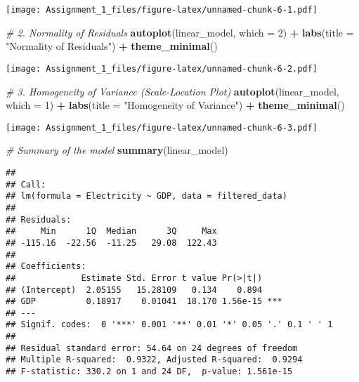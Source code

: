 \documentclass[
]{article}
\newenvironment{Shaded}{\begin{snugshade}}{\end{snugshade}}
\newcommand{\AttributeTok}[1]{\textcolor[rgb]{0.13,0.29,0.53}{#1}}
\newcommand{\CommentTok}[1]{\textcolor[rgb]{0.56,0.35,0.01}{\textit{#1}}}
\newcommand{\DecValTok}[1]{\textcolor[rgb]{0.00,0.00,0.81}{#1}}
\newcommand{\FunctionTok}[1]{\textcolor[rgb]{0.13,0.29,0.53}{\textbf{#1}}}
\newcommand{\NormalTok}[1]{#1}
\newcommand{\SpecialCharTok}[1]{\textcolor[rgb]{0.81,0.36,0.00}{\textbf{#1}}}
\newcommand{\StringTok}[1]{\textcolor[rgb]{0.31,0.60,0.02}{#1}}
\begin{document}
\texttt{[image: Assignment\_1\_files/figure-latex/unnamed-chunk-6-1.pdf]}

\begin{Shaded}
\begin{Highlighting}[]
\CommentTok{\# 2. Normality of Residuals}
\FunctionTok{autoplot}\NormalTok{(linear\_model, }\AttributeTok{which =} \DecValTok{2}\NormalTok{) }\SpecialCharTok{+} 
  \FunctionTok{labs}\NormalTok{(}\AttributeTok{title =} \StringTok{"Normality of Residuals"}\NormalTok{) }\SpecialCharTok{+}
  \FunctionTok{theme\_minimal}\NormalTok{()}
\end{Highlighting}
\end{Shaded}

\texttt{[image: Assignment\_1\_files/figure-latex/unnamed-chunk-6-2.pdf]}

\begin{Shaded}
\begin{Highlighting}[]
\CommentTok{\# 3. Homogeneity of Variance (Scale{-}Location Plot)}
\FunctionTok{autoplot}\NormalTok{(linear\_model, }\AttributeTok{which =} \DecValTok{1}\NormalTok{) }\SpecialCharTok{+} 
  \FunctionTok{labs}\NormalTok{(}\AttributeTok{title =} \StringTok{"Homogeneity of Variance"}\NormalTok{) }\SpecialCharTok{+}
  \FunctionTok{theme\_minimal}\NormalTok{()}
\end{Highlighting}
\end{Shaded}

\texttt{[image: Assignment\_1\_files/figure-latex/unnamed-chunk-6-3.pdf]}

\begin{Shaded}
\begin{Highlighting}[]
\CommentTok{\# Summary of the model}
\FunctionTok{summary}\NormalTok{(linear\_model)}
\end{Highlighting}
\end{Shaded}

\begin{verbatim}
## 
## Call:
## lm(formula = Electricity ~ GDP, data = filtered_data)
## 
## Residuals:
##     Min      1Q  Median      3Q     Max 
## -115.16  -22.56  -11.25   29.08  122.43 
## 
## Coefficients:
##             Estimate Std. Error t value Pr(>|t|)    
## (Intercept)  2.05155   15.28109   0.134    0.894    
## GDP          0.18917    0.01041  18.170 1.56e-15 ***
## ---
## Signif. codes:  0 '***' 0.001 '**' 0.01 '*' 0.05 '.' 0.1 ' ' 1
## 
## Residual standard error: 54.64 on 24 degrees of freedom
## Multiple R-squared:  0.9322, Adjusted R-squared:  0.9294 
## F-statistic: 330.2 on 1 and 24 DF,  p-value: 1.561e-15
\end{verbatim}
\end{document}
